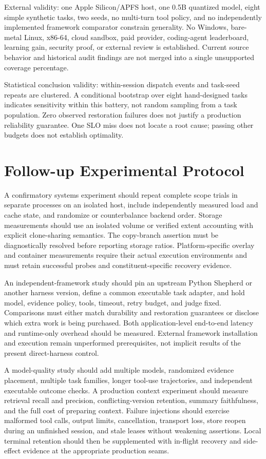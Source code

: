 \documentclass[11pt,a4paper]{article}
\begin{document}
External validity: one Apple Silicon/APFS host, one 0.5B quantized model, eight simple synthetic tasks, two seeds, no multi-turn tool policy, and no independently implemented framework comparator constrain generality. No Windows, bare-metal Linux, x86-64, cloud sandbox, paid provider, coding-agent leaderboard, learning gain, security proof, or external review is established. Current source behavior and historical audit findings are not merged into a single unsupported coverage percentage.


Statistical conclusion validity: within-session dispatch events and task-seed repeats are clustered. A conditional bootstrap over eight hand-designed tasks indicates sensitivity within this battery, not random sampling from a task population. Zero observed restoration failures does not justify a production reliability guarantee. One SLO miss does not locate a root cause; passing other budgets does not establish optimality.


\section{Follow-up Experimental Protocol}

A confirmatory systems experiment should repeat complete scope trials in separate processes on an isolated host, include independently measured load and cache state, and randomize or counterbalance backend order. Storage measurements should use an isolated volume or verified extent accounting with explicit clone-sharing semantics. The copy-branch assertion must be diagnostically resolved before reporting storage ratios. Platform-specific overlay and container measurements require their actual execution environments and must retain successful probes and constituent-specific recovery evidence.


An independent-framework study should pin an upstream Python Shepherd or another harness version, define a common executable task adapter, and hold model, evidence policy, tools, timeout, retry budget, and judge fixed. Comparisons must either match durability and restoration guarantees or disclose which extra work is being purchased. Both application-level end-to-end latency and runtime-only overhead should be measured. External framework installation and execution remain unperformed prerequisites, not implicit results of the present direct-harness control.


A model-quality study should add multiple models, randomized evidence placement, multiple task families, longer tool-use trajectories, and independent executable outcome checks. A production context experiment should measure retrieval recall and precision, conflicting-version retention, summary faithfulness, and the full cost of preparing context. Failure injections should exercise malformed tool calls, output limits, cancellation, transport loss, store reopen during an unfinished session, and stale leases without weakening assertions. Local terminal retention should then be supplemented with in-flight recovery and side-effect evidence at the appropriate production seams.
\end{document}
